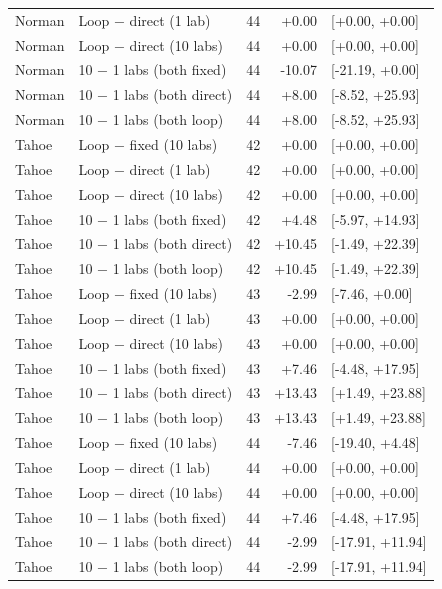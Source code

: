 \begin{longtable}{llrrl}
Norman & Loop $-$ direct (1 lab) & 44 & +0.00 & [+0.00, +0.00] \\
Norman & Loop $-$ direct (10 labs) & 44 & +0.00 & [+0.00, +0.00] \\
Norman & 10 $-$ 1 labs (both fixed) & 44 & -10.07 & [-21.19, +0.00] \\
Norman & 10 $-$ 1 labs (both direct) & 44 & +8.00 & [-8.52, +25.93] \\
Norman & 10 $-$ 1 labs (both loop) & 44 & +8.00 & [-8.52, +25.93] \\
\midrule
Tahoe & Loop $-$ fixed (10 labs) & 42 & +0.00 & [+0.00, +0.00] \\
Tahoe & Loop $-$ direct (1 lab) & 42 & +0.00 & [+0.00, +0.00] \\
Tahoe & Loop $-$ direct (10 labs) & 42 & +0.00 & [+0.00, +0.00] \\
Tahoe & 10 $-$ 1 labs (both fixed) & 42 & +4.48 & [-5.97, +14.93] \\
Tahoe & 10 $-$ 1 labs (both direct) & 42 & +10.45 & [-1.49, +22.39] \\
Tahoe & 10 $-$ 1 labs (both loop) & 42 & +10.45 & [-1.49, +22.39] \\
\midrule
Tahoe & Loop $-$ fixed (10 labs) & 43 & -2.99 & [-7.46, +0.00] \\
Tahoe & Loop $-$ direct (1 lab) & 43 & +0.00 & [+0.00, +0.00] \\
Tahoe & Loop $-$ direct (10 labs) & 43 & +0.00 & [+0.00, +0.00] \\
Tahoe & 10 $-$ 1 labs (both fixed) & 43 & +7.46 & [-4.48, +17.95] \\
Tahoe & 10 $-$ 1 labs (both direct) & 43 & +13.43 & [+1.49, +23.88] \\
Tahoe & 10 $-$ 1 labs (both loop) & 43 & +13.43 & [+1.49, +23.88] \\
\midrule
Tahoe & Loop $-$ fixed (10 labs) & 44 & -7.46 & [-19.40, +4.48] \\
Tahoe & Loop $-$ direct (1 lab) & 44 & +0.00 & [+0.00, +0.00] \\
Tahoe & Loop $-$ direct (10 labs) & 44 & +0.00 & [+0.00, +0.00] \\
Tahoe & 10 $-$ 1 labs (both fixed) & 44 & +7.46 & [-4.48, +17.95] \\
Tahoe & 10 $-$ 1 labs (both direct) & 44 & -2.99 & [-17.91, +11.94] \\
Tahoe & 10 $-$ 1 labs (both loop) & 44 & -2.99 & [-17.91, +11.94] \\
\midrule
\bottomrule
\end{longtable}
